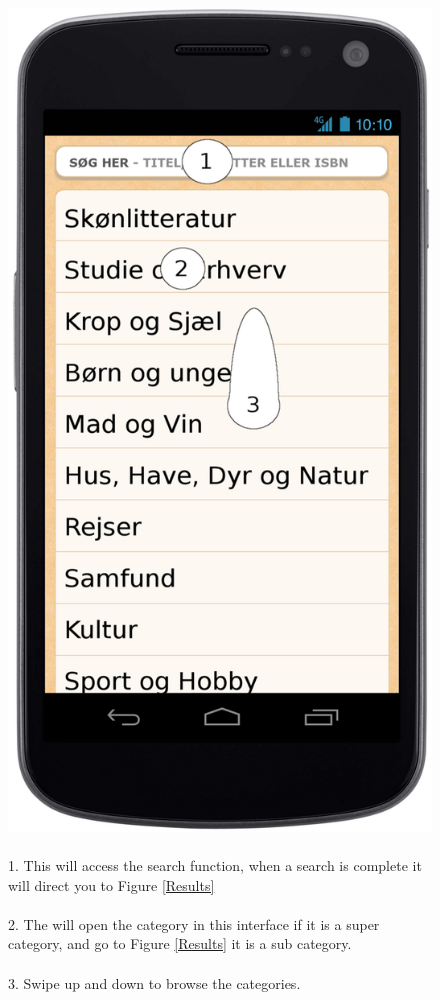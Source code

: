 \documentclass[12pt]{article}
\begin{document}
\begin{figure}
\includegraphics[scale=0.7]{gnexsoegeogbrowse.png}
\caption{
\\
1. This will access the search function, when a search is complete it will direct you to Figure \ref{Results}\\\\
2. The will open the category in this interface if it is a super category, and go to Figure \ref{Results} it is a sub category.\\\\
3. Swipe up and down to browse the categories.
}
\label{Categories}
\end{figure}
\end{document}
